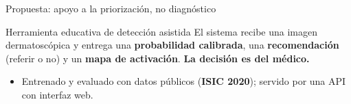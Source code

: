 \documentclass[aspectratio=169,10pt]{beamer}
\begin{document}
\begin{frame}{Propuesta: apoyo a la priorización, no diagnóstico}
  \begin{block}{Herramienta educativa de detección asistida}
    El sistema recibe una imagen dermatoscópica y entrega una \textbf{probabilidad calibrada}, una \textbf{recomendación} (referir o no) y un \textbf{mapa de activación}. \textbf{La decisión es del médico.}
  \end{block}
  \vspace{0.8em}
  \begin{center}
  \end{center}
  \vspace{0.8em}
  \begin{itemize}
    \item Entrenado y evaluado con datos públicos (\textbf{ISIC 2020}); servido por una API con interfaz web.  \end{itemize}
\end{frame}
\end{document}
